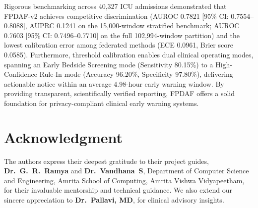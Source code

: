 \documentclass[final,5p,times,twocolumn]{elsarticle}
\begin{document}
Rigorous benchmarking across 40,327 ICU admissions demonstrated that FPDAF-v2 achieves competitive discrimination (AUROC 0.7821 [95\% CI: 0.7554--0.8088], AUPRC 0.1241 on the 15,000-window stratified benchmark; AUROC 0.7603 [95\% CI: 0.7496--0.7710] on the full 102,994-window partition) and the lowest calibration error among federated methods (ECE 0.0961, Brier score 0.0585). Furthermore, threshold calibration enables dual clinical operating modes, spanning an Early Bedside Screening mode (Sensitivity 80.15\%) to a High-Confidence Rule-In mode (Accuracy 96.20\%, Specificity 97.80\%), delivering actionable notice within an average 4.98-hour early warning window. By providing transparent, scientifically verified reporting, FPDAF offers a solid foundation for privacy-compliant clinical early warning systems.

\section*{Acknowledgment}
The authors express their deepest gratitude to their project guides, \textbf{Dr.~G.~R.~Ramya} and \textbf{Dr.~Vandhana~S}, Department of Computer Science and Engineering, Amrita School of Computing, Amrita Vishwa Vidyapeetham, for their invaluable mentorship and technical guidance. We also extend our sincere appreciation to \textbf{Dr.~Pallavi, MD}, for clinical advisory insights.

\balance


\end{document}
